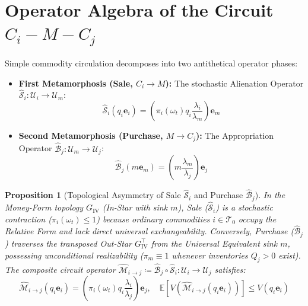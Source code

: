 \documentclass[11pt,a4paper]{article}
\newtheorem{proposition}{Proposition}[section]
\begin{document}
\section{Operator Algebra of the Circuit $C_i - M - C_j$}

Simple commodity circulation decomposes into two antithetical operator phases:
\begin{itemize}
    \item \textbf{First Metamorphosis (Sale, $C_i \to M$):} The stochastic Alienation Operator $\hat{\mathcal{S}}_i: \mathcal{U}_i \to \mathcal{U}_m$:
    \begin{equation}
        \hat{\mathcal{S}}_i(q_i \mathbf{e}_i) = \left( \pi_i(\omega_t) q_i \frac{\lambda_i}{\lambda_m} \right) \mathbf{e}_m
    \end{equation}
    \item \textbf{Second Metamorphosis (Purchase, $M \to C_j$):} The Appropriation Operator $\hat{\mathcal{B}}_j: \mathcal{U}_m \to \mathcal{U}_j$:
    \begin{equation}
        \hat{\mathcal{B}}_j(m \mathbf{e}_m) = \left( m \frac{\lambda_m}{\lambda_j} \right) \mathbf{e}_j
    \end{equation}
\end{itemize}

\begin{proposition}[Topological Asymmetry of Sale $\hat{\mathcal{S}}_i$ and Purchase $\hat{\mathcal{B}}_j$]
In the Money-Form topology $G_{\text{IV}}$ (In-Star with sink $m$), Sale ($\hat{\mathcal{S}}_i$) is a stochastic contraction ($\pi_i(\omega_t) \le 1$) because ordinary commodities $i \in \mathcal{T}_0$ occupy the Relative Form and lack direct universal exchangeability. Conversely, Purchase ($\hat{\mathcal{B}}_j$) traverses the transposed Out-Star $G_{\text{IV}}^\top$ from the Universal Equivalent sink $m$, possessing unconditional realizability ($\pi_m \equiv 1$ whenever inventories $Q_j > 0$ exist). The composite circuit operator $\hat{\mathcal{M}}_{i \to j} \coloneqq \hat{\mathcal{B}}_j \circ \hat{\mathcal{S}}_i: \mathcal{U}_i \to \mathcal{U}_j$ satisfies:
\begin{equation}
    \hat{\mathcal{M}}_{i \to j}(q_i \mathbf{e}_i) = \left( \pi_i(\omega_t) q_i \frac{\lambda_i}{\lambda_j} \right) \mathbf{e}_j, \quad \mathbb{E}\!\left[V\!\left(\hat{\mathcal{M}}_{i \to j}(q_i \mathbf{e}_i)\right)\right] \le V(q_i \mathbf{e}_i)
\end{equation}
\end{proposition}
\end{document}
